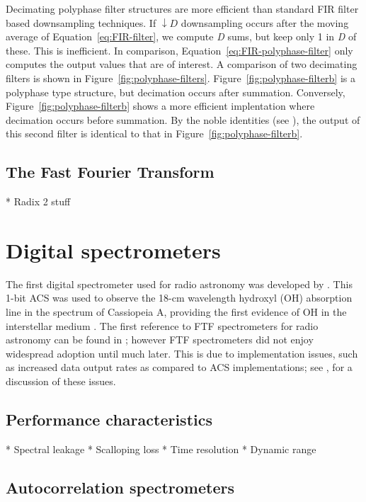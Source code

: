 \documentclass{ws-rv961x669}
\begin{document}
Decimating polyphase filter structures are more efficient than standard FIR filter based downsampling techniques. If $\downarrow D$ downsampling occurs after the moving average of Equation~\ref{eq:FIR-filter}, we compute \emph{D} sums, but keep only 1 in \emph{D} of these. This is inefficient. In comparison, Equation~\ref{eq:FIR-polyphase-filter} only computes the output values that are of interest. A comparison of two decimating filters is shown in Figure~\ref{fig:polyphase-filters}. Figure~\ref{fig:polyphase-filterb} is a polyphase type structure, but decimation occurs after summation. Conversely, Figure~\ref{fig:polyphase-filterb} shows a more efficient implentation where decimation occurs before summation. By the noble identities (see \citep{Vaidyanathan:1990p6127}), the output of this second filter is identical to that in Figure~\ref{fig:polyphase-filterb}.


\subsection{The Fast Fourier Transform}

* Radix 2 stuff

\section{Digital spectrometers}

The first digital spectrometer used for radio astronomy was developed by \citet{Weinreb:1963p10042}. This 1-bit ACS was used to observe the 18-cm wavelength hydroxyl (OH) absorption line in the spectrum of Cassiopeia A, providing the first evidence of OH in the interstellar medium \citep{Weinreb:1963p9992}. The first reference to FTF spectrometers for radio astronomy can be found in \citet{Chikada:1987p10044}; however FTF spectrometers did not enjoy widespread adoption until much later. This is due to implementation issues, such as increased data output rates as compared to ACS implementations; see \citet{Bunton2000}, for a discussion of these issues.


\subsection{Performance characteristics}

* Spectral leakage
* Scalloping loss
* Time resolution
* Dynamic range

\subsection{Autocorrelation spectrometers}
\end{document}
